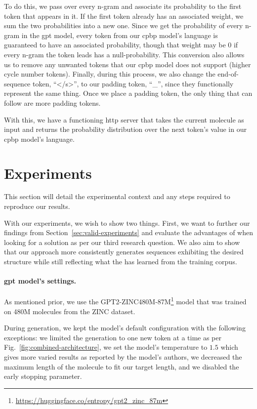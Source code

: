 \documentclass[../Document.tex]{subfiles}
\begin{document}
To do this, we pass over every n-gram and associate its probability to the first token that appears in it.
If the first token already has an associated weight, we sum the two probabilities into a new one.
Since we get the probability of every n-gram in the \gls{gpt} model, every token from our \gls{cpbp} model's language is guaranteed to have an associated probability, though that weight may be $0$ if every n-gram the token leads has a null-probability.
This conversion also allows us to remove any unwanted tokens that our \gls{cpbp} model does not support (\eg higher cycle number tokens).
Finally, during this process, we also change the end-of-sequence token, ``</s>'', to our padding token, ``\_'', since they functionally represent the same thing. Once we place a padding token, the only thing that can follow are more padding tokens. 

With this, we have a functioning \gls{http} server that takes the current molecule as input and returns the probability distribution over the next token's value in our \gls{cpbp} model's language.


\section{Experiments}
\label{sec:gptcp-experiments}
This section will detail the experimental context and any steps required to reproduce our results.

With our experiments, we wish to show two things.
First, we want to further our findings from Section~\ref{sec:valid-experiments} and evaluate the advantages of \bp when looking for a solution as per our third research question.
We also aim to show that our approach more consistently generates sequences exhibiting the desired structure while still reflecting what the \nn has learned from the training corpus.

\paragraph{\gls{gpt} model's settings.}
As mentioned prior, we use the GPT2-ZINC480M-87M\footnote{\url{https://huggingface.co/entropy/gpt2_zinc_87m}} model that was trained on 480M molecules from the ZINC dataset. 

During generation, we kept the model's default configuration with the following exceptions:
we limited the generation to one new token at a time as per Fig.~\ref{fig:combined-architecture}, 
we set the model's temperature to $1.5$ which gives more varied results as reported by the model's authors, 
we decreased the maximum length of the molecule to fit our target length, 
and we disabled the early stopping parameter.
\end{document}
